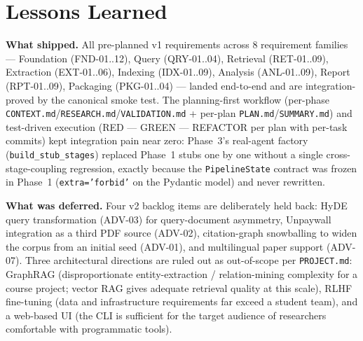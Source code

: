\documentclass[12pt,a4paper]{article}
\begin{document}
\section{Lessons Learned}

\textbf{What shipped.} All pre-planned v1 requirements across 8 requirement
families --- Foundation (FND-01..12), Query (QRY-01..04), Retrieval (RET-01..09),
Extraction (EXT-01..06), Indexing (IDX-01..09), Analysis (ANL-01..09), Report
(RPT-01..09), Packaging (PKG-01..04) --- landed end-to-end and are integration-proved
by the canonical smoke test. The planning-first workflow (per-phase
\texttt{CONTEXT.md}/\texttt{RESEARCH.md}/\texttt{VALIDATION.md} + per-plan
\texttt{PLAN.md}/\texttt{SUMMARY.md}) and test-driven execution (RED --- GREEN ---
REFACTOR per plan with per-task commits) kept integration pain near zero: Phase~3's
real-agent factory (\texttt{build\_stub\_stages}) replaced Phase~1 stubs one by one
without a single cross-stage-coupling regression, exactly because the
\texttt{PipelineState} contract was frozen in Phase~1 (\texttt{extra='forbid'} on
the Pydantic model) and never rewritten.

\textbf{What was deferred.} Four v2 backlog items are deliberately held back:
HyDE query transformation (ADV-03) for query-document asymmetry, Unpaywall
integration as a third PDF source (ADV-02), citation-graph snowballing to widen
the corpus from an initial seed (ADV-01), and multilingual paper support (ADV-07).
Three architectural directions are ruled out as out-of-scope per \texttt{PROJECT.md}:
GraphRAG (disproportionate entity-extraction / relation-mining complexity for a
course project; vector RAG gives adequate retrieval quality at this scale), RLHF
fine-tuning (data and infrastructure requirements far exceed a student team), and
a web-based UI (the CLI is sufficient for the target audience of researchers
comfortable with programmatic tools).
\end{document}
